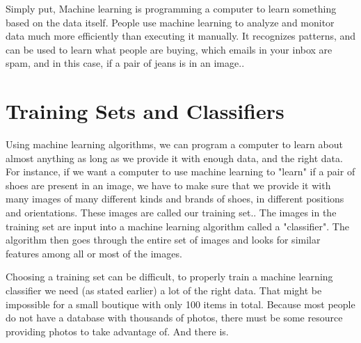 \documentclass[12pt]{report} %
\begin{document}
	Simply put, Machine learning is programming a computer to learn something based on the data itself. People use machine learning to analyze and monitor data much more efficiently than executing it manually. It recognizes patterns, and can be used to learn what people are buying, which emails in your inbox are spam, and in this case, if a pair of jeans is in an image.\cite{aurelienMachineLearning}. 

\section{Training Sets and Classifiers}
	Using machine learning algorithms, we can program a computer to learn about almost anything as long as we provide it with enough data, and the right data. For instance, if we want a computer to use machine learning to "learn" if a pair of shoes are present in an image, we have to make sure that we provide it with many images of many different kinds and brands of shoes, in different positions and orientations. These images are called our training set.\cite{aurelienMachineLearning}. The images in the training set are input into a machine learning algorithm called a "classifier"\cite{KubatMachineLearn}. The algorithm then goes through the entire set of images and looks for similar features among all or most of the images. 
	
	Choosing a training set can be difficult, to properly train a machine learning classifier we need (as stated earlier) a lot of the right data. That might be impossible for a small boutique 
with only 100 items in total. Because most people do not have a database with thousands of photos, there must be some resource providing photos to take advantage of. And there is. 
\end{document}
